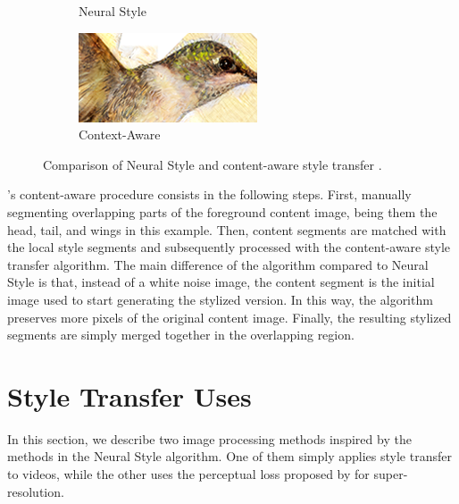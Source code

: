 \begin{figure}[t]
\begin{subfigure}[b]{0.244\textwidth}
    \caption{Neural Style}
  \end{subfigure}
  \begin{subfigure}[b]{0.244\textwidth}
    \includegraphics[width=\textwidth]{gfx/app-content-aware-8}
    \caption{Context-Aware}
  \end{subfigure}
  \caption{
    Comparison of Neural Style and content-aware style transfer \cite{Yin2016}.
  }
  \label{sec:applications:improvements:content-aware}
\end{figure}

\citeauthor{Yin2016}'s content-aware procedure consists in the following steps.
First, manually segmenting overlapping parts of the foreground content image, being them the head, tail, and wings in this example.
Then, content segments are matched with the local style segments and subsequently processed with the content-aware style transfer algorithm.
The main difference of the algorithm compared to Neural Style is that, instead of a white noise image, the content segment is the initial image used to start generating the stylized version.
In this way, the algorithm preserves more pixels of the original content image.
Finally, the resulting stylized segments are simply merged together in the overlapping region.



\section{Style Transfer Uses}
\label{sec:applications:uses}

In this section, we describe two image processing methods inspired by the methods in the Neural Style algorithm.
One of them simply applies style transfer to videos, while the other uses the perceptual loss proposed by \citeauthor{Gatys2015B} for super-resolution.

